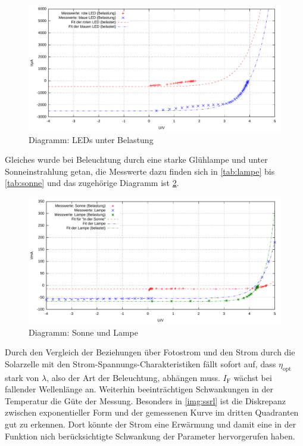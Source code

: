 \documentclass[numbers=noenddot,12pt,a4paper]{scrartcl}
\newcommand{\ix}[1]{_\text{#1}}
\begin{document}
\begin{figure}[H]
	\includegraphics[width=1\textwidth]{messwerte/stromspannungspannungsrichtigbelastungled.pdf}
	\caption{Diagramm: LEDs unter Belastung} \label{img:ssrbl}
\end{figure}
Gleiches wurde bei Beleuchtung durch eine starke Glühlampe und unter Sonneinstrahlung getan, die Messwerte dazu finden sich in \ref{tab:lampe} bis \ref{tab:sonne} und das zugehörige Diagramm ist \ref{img:sslus}.
\begin{figure}[H]
	\includegraphics[width=1\textwidth]{messwerte/stromspannunglampeundsonne.pdf}
	\caption{Diagramm: Sonne und Lampe} \label{img:sslus}
\end{figure}
Durch den Vergleich der Beziehungen über Fotostrom und den Strom durch die Solarzelle mit den Strom-Spannungs-Charakteristiken fällt sofort auf, dass $\eta\ix{opt}$ stark von $\lambda$, also der Art der Beleuchtung, abhängen muss. $I\ix{F}$ wächst bei fallender Wellenlänge an. Weiterhin beeinträchtigen Schwankungen in der Temperatur die Güte der Messung. Besonders in \ref{img:ssrl} ist die Diskrepanz zwischen exponentieller Form und der gemessenen Kurve im dritten Quadranten gut zu erkennen. Dort könnte der Strom eine Erwärmung und damit eine in der Funktion nich berücksichtigte Schwankung der Parameter hervorgerufen haben.\\
\end{document}

